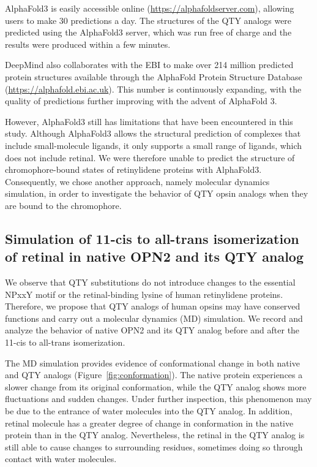 \documentclass[fleqn, 10pt, lineno]{manuscript}
\begin{document}
AlphaFold3 is easily accessible online (\url{https://alphafoldserver.com}), allowing users to make 30 predictions a day. The structures of the QTY analogs were predicted using the AlphaFold3 server, which was run free of charge and the results were produced within a few minutes. 

DeepMind also collaborates with the EBI to make over 214 million predicted protein structures available through the AlphaFold Protein Structure Database (\url{https://alphafold.ebi.ac.uk}). This number is continuously expanding, with the quality of predictions further improving with the advent of AlphaFold 3. 

However, AlphaFold3 still has limitations that have been encountered in this study. Although AlphaFold3 allows the structural prediction of complexes that include small-molecule ligands, it only supports a small range of ligands, which does not include retinal. We were therefore unable to predict the structure of chromophore-bound states of retinylidene proteins with AlphaFold3. Consequently, we chose another approach, namely molecular dynamics simulation, in order to investigate the behavior of QTY opsin analogs when they are bound to the chromophore. 

\subsection*{Simulation of 11-cis to all-trans isomerization of retinal in native OPN2 and its QTY analog}

We observe that QTY substitutions do not introduce changes to the essential NPxxY motif or the retinal-binding lysine of human retinylidene proteins. Therefore, we propose that QTY analogs of human opsins may have conserved functions and carry out a molecular dynamics (MD) simulation. We record and analyze the behavior of native OPN2 and its QTY analog before and after the 11-cis to all-trans isomerization. 

The MD simulation provides evidence of conformational change in both native and QTY analogs (Figure~\ref{fig:conformation}). The native protein experiences a slower change from its original conformation, while the QTY analog shows more fluctuations and sudden changes. Under further inspection, this phenomenon may be due to the entrance of water molecules into the QTY analog. In addition, retinal molecule has a greater degree of change in conformation in the native protein than in the QTY analog. Nevertheless, the retinal in the QTY analog is still able to cause changes to surrounding residues, sometimes doing so through contact with water molecules. 
\end{document}
